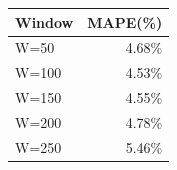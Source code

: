 {\tiny\setlength{\tabcolsep}{2pt}\begin{tabular}{lr} \toprule
Window & MAPE(\%) \\ \midrule
W=50 & 4.68\% \\ 
W=100 & 4.53\% \\ 
W=150 & 4.55\% \\ 
W=200 & 4.78\% \\ 
W=250 & 5.46\% \\ 
\bottomrule \end{tabular}}